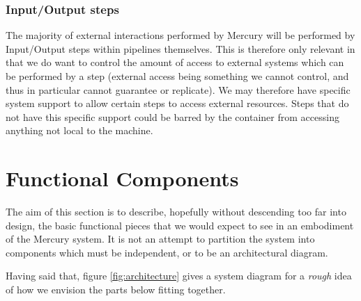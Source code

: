 \documentclass[10pt,a4paper]{article}
\newcommand{\npar}{\par\noindent\space}
\begin{document}
\subsubsection{Input/Output steps}
\npar The majority of external interactions performed by Mercury will be performed by Input/Output steps within pipelines themselves. This is therefore only relevant in that we do want to control the amount of access to external systems which can be performed by a step (external access being something we cannot control, and thus in particular cannot guarantee or replicate). We may therefore have specific system support to allow certain steps to access external resources. Steps that do not have this specific support could be barred by the container from accessing anything not local to the machine.



\section{Functional Components}
\npar The aim of this section is to describe, hopefully without descending too far into design, the basic functional pieces that we would expect to see in an embodiment of the Mercury system. It is not an attempt to partition the system into components which must be independent, or to be an architectural diagram.
\npar Having said that, figure \ref{fig:architecture} gives a system diagram for a \textit{rough} idea of how we envision the parts below fitting together.
\end{document}
